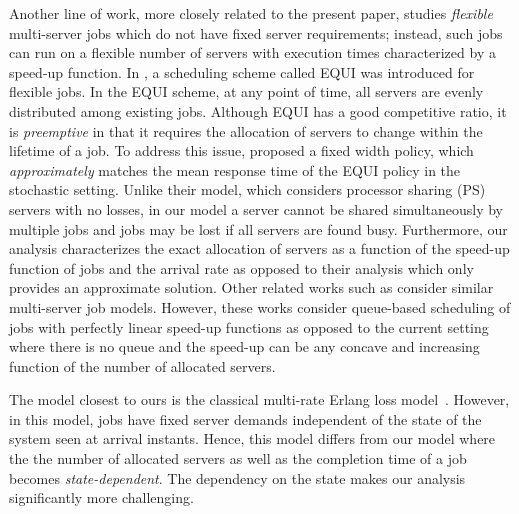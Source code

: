 \documentclass[a4paper]{article}
\theoremstyle{plain}
\theoremstyle{definition}
\theoremstyle{case}
\theoremstyle{remark}
\begin{document}
Another line of work, more closely related to the present paper, studies {\em flexible} multi-server jobs which do not have fixed server requirements; instead, such jobs can run on a flexible number of servers with execution times characterized by a speed-up function. 
In \cite{first_speed_up}, 
a scheduling scheme called EQUI was introduced for flexible jobs. In the EQUI scheme, at any point of time, all servers are evenly distributed among existing jobs. Although EQUI has a good competitive ratio, it is {\em preemptive} in that it requires the allocation of servers to change within the lifetime of a job.
To address this issue, %
\cite{Berg_speedup_2018} proposed a fixed width policy, which {\em approximately} matches the mean response time of the EQUI policy in the stochastic setting. Unlike their model, which considers processor sharing (PS) servers with no losses, in our model a server cannot be shared simultaneously by multiple jobs and jobs may be lost if all servers are found busy. Furthermore, our analysis characterizes 
the exact allocation of servers as a function of the speed-up function of jobs and the arrival rate as opposed to their analysis which only provides an approximate solution. Other related works such as \cite{Berg_speedup_2020,Berge_different_phase_2021,WCFS_Grososf_2022} consider similar multi-server job models. However, these works consider queue-based scheduling of jobs with perfectly linear speed-up functions as opposed to the current setting where there is no queue and the speed-up can be any concave and increasing function of the number of allocated servers. 

The model closest to ours is the classical multi-rate Erlang loss model~\cite{kelly_loss,mazum_blocking}. However, in this model, jobs have fixed server demands independent of the state of the system seen at arrival instants. Hence, this model differs from our model where the the number of allocated servers as well as the completion time of a job becomes {\em state-dependent}. The dependency on the state makes our analysis significantly more challenging.

\end{document}
